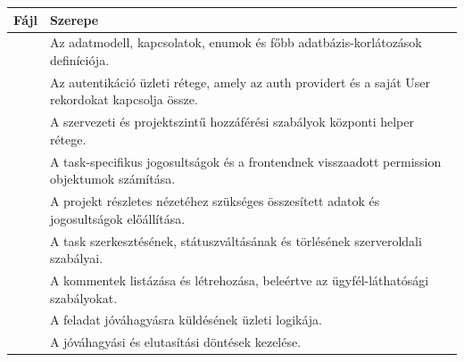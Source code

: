 \documentclass[11pt,a4paper]{report}
\begin{document}
    \begin{longtable}{L{0.43\textwidth}L{0.47\textwidth}}
        \toprule
        \textbf{Fájl} & \textbf{Szerepe} \\
        \midrule
        \endhead

        \footnotesize{}
        &
        Az adatmodell, kapcsolatok, enumok és főbb adatbázis-korlátozások definíciója.
        \\[3pt]

        \footnotesize{}
        &
        Az autentikáció üzleti rétege, amely az auth providert és a saját User
        rekordokat kapcsolja össze.
        \\[3pt]

        \footnotesize{}
        &
        A szervezeti és projektszintű hozzáférési szabályok központi helper rétege.
        \\[3pt]

        \footnotesize{}
        &
        A task-specifikus jogosultságok és a frontendnek visszaadott permission
        objektumok számítása.
        \\[3pt]

        \footnotesize{}
        &
        A projekt részletes nézetéhez szükséges összesített adatok és jogosultságok
        előállítása.
        \\[3pt]

        \footnotesize{}
        &
        A task szerkesztésének, státuszváltásának és törlésének szerveroldali szabályai.
        \\[3pt]

        \footnotesize{}
        &
        A kommentek listázása és létrehozása, beleértve az ügyfél-láthatósági
        szabályokat.
        \\[3pt]

        \footnotesize{}
        &
        A feladat jóváhagyásra küldésének üzleti logikája.
        \\[3pt]

        \footnotesize{}
        &
        A jóváhagyási és elutasítási döntések kezelése.
        \\[3pt]


\end{longtable}
\end{document}
